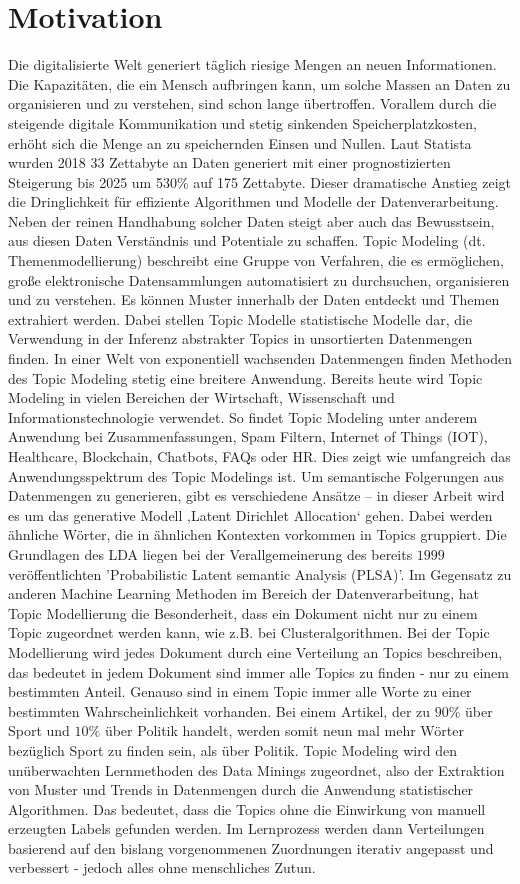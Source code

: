 \documentclass[german,version-2020-11]{uzl-thesis}
\begin{document}
\section{Motivation}
Die digitalisierte Welt generiert täglich riesige Mengen an neuen Informationen. Die Kapazitäten, die ein Mensch aufbringen kann, um solche Massen an Daten zu organisieren und zu verstehen, sind schon lange übertroffen. Vorallem durch die steigende digitale Kommunikation und stetig sinkenden Speicherplatzkosten, erhöht sich die Menge an zu speichernden Einsen und Nullen. Laut Statista wurden 2018 33 Zettabyte an Daten generiert mit einer prognostizierten Steigerung bis 2025 um 530\% auf 175 Zettabyte. Dieser dramatische Anstieg zeigt die Dringlichkeit für effiziente Algorithmen und Modelle der Datenverarbeitung. Neben der reinen Handhabung solcher Daten steigt aber auch das Bewusstsein, aus diesen Daten Verständnis und Potentiale zu schaffen. Topic Modeling (dt. Themenmodellierung) beschreibt eine Gruppe von Verfahren, die es ermöglichen, große elektronische Datensammlungen automatisiert zu durchsuchen, organisieren und zu verstehen. Es können Muster innerhalb der Daten entdeckt und Themen extrahiert werden. Dabei stellen Topic Modelle statistische Modelle dar, die Verwendung in der Inferenz abstrakter Topics in unsortierten Datenmengen finden. In einer Welt von exponentiell wachsenden Datenmengen finden Methoden des Topic Modeling stetig eine breitere Anwendung. Bereits heute wird Topic Modeling in vielen Bereichen der Wirtschaft, Wissenschaft und Informationstechnologie verwendet. So findet Topic Modeling unter anderem Anwendung bei Zusammenfassungen, Spam Filtern, Internet of Things (IOT), Healthcare, Blockchain, Chatbots, FAQs oder HR. Dies zeigt wie umfangreich das Anwendungsspektrum des Topic Modelings ist. Um semantische Folgerungen aus Datenmengen zu generieren, gibt es verschiedene Ansätze – in dieser Arbeit wird es um das generative Modell ‚Latent Dirichlet Allocation‘ gehen. Dabei werden ähnliche Wörter, die in ähnlichen Kontexten vorkommen in Topics gruppiert. Die Grundlagen des LDA liegen bei der Verallgemeinerung des bereits $1999$ veröffentlichten 'Probabilistic Latent semantic Analysis (PLSA)'. Im Gegensatz zu anderen Machine Learning Methoden im Bereich der Datenverarbeitung, hat Topic Modellierung die Besonderheit, dass ein Dokument nicht nur zu einem Topic zugeordnet werden kann, wie z.B. bei Clusteralgorithmen. Bei der Topic Modellierung wird jedes Dokument durch eine Verteilung an Topics beschreiben, das bedeutet in jedem Dokument sind immer alle Topics zu finden - nur zu einem bestimmten Anteil. Genauso sind in einem Topic immer alle Worte zu einer bestimmten Wahrscheinlichkeit vorhanden. Bei einem Artikel, der zu $90\%$ über Sport und $10\%$ über Politik handelt, werden somit neun mal mehr Wörter bezüglich Sport zu finden sein, als über Politik. Topic Modeling wird den unüberwachten Lernmethoden des Data Minings zugeordnet, also der Extraktion von Muster und Trends in Datenmengen durch die Anwendung statistischer Algorithmen. Das bedeutet, dass die Topics ohne die Einwirkung von manuell erzeugten Labels gefunden werden. Im Lernprozess werden dann Verteilungen basierend auf den bislang vorgenommenen Zuordnungen iterativ angepasst und verbessert - jedoch alles ohne menschliches Zutun. 
\end{document}
